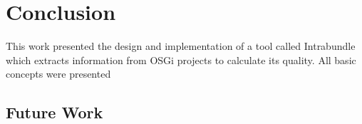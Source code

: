 \chapter{Conclusion}
This work presented the design and implementation of a tool called Intrabundle which extracts information from OSGi projects to calculate its quality. All basic concepts were presented


\section{Future Work}


